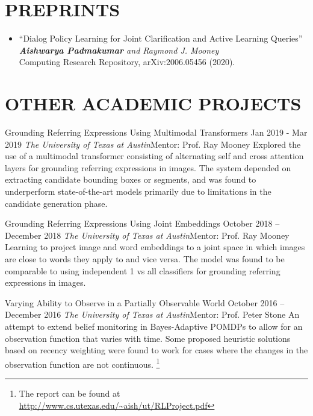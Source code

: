 \documentclass[letterpaper,10pt]{resume}
\begin{document}
{\section{PREPRINTS}
\begin{itemize}
\item ``Dialog Policy Learning for Joint Clarification and Active Learning Queries'' \\
\textit{\textbf{Aishwarya Padmakumar} and Raymond J. Mooney} \\
Computing Research Repository, arXiv:2006.05456 (2020).
\vspace{0.2cm}
\end{itemize}

\section{OTHER ACADEMIC PROJECTS}
\begin{itemize}
  \credentialtwo
    {{Grounding Referring Expressions Using Multimodal Transformers}}
    {\sf Jan 2019 - Mar 2019}
    {\it The University of Texas at Austin}{\textsf{Mentor: Prof. Ray Mooney}}
    {}
    { 
    \small 
    Explored the use of a multimodal transformer consisting of alternating self and cross attention layers for grounding referring expressions in images. The system depended on extracting candidate bounding boxes or segments, and was found to underperform state-of-the-art models primarily due to limitations in the candidate generation phase. 
    }
   \vspace{0.2cm}


  \credentialtwo
    {{Grounding Referring Expressions Using Joint Embeddings}}
    {\sf October 2018 -- December 2018}
    {\it The University of Texas at Austin}{\textsf{Mentor: Prof. Ray Mooney}}
    {}
    { 
    \small 
	Learning to project image and word embeddings to a joint space in which images are close to words they apply to and vice versa. The model was found to be comparable to using independent 1 vs all classifiers for grounding referring expressions in images. 
    }
   \vspace{0.2cm}


  \credentialtwo
    {{Varying Ability to Observe in a Partially Observable World}}
    {\sf October 2016 -- December 2016}
    {\it The University of Texas at Austin}{\textsf{Mentor: Prof. Peter Stone}}
    {}
    { 
    \small 
	An attempt to extend belief monitoring in Bayes-Adaptive POMDPs to allow for an observation function that varies with time. Some proposed heuristic solutions based on recency weighting were found to work for cases where the changes in the observation function are not continuous. \footnote{The report can be found at \url{http://www.cs.utexas.edu/~aish/ut/RLProject.pdf}}
    }
   \vspace{0.2cm}   


\end{itemize}}
\end{document}
